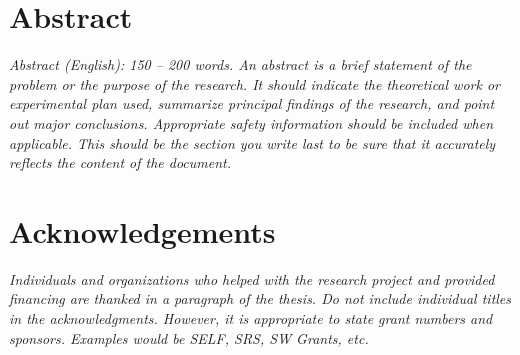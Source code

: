 \documentclass[12pt, a4paper, oneside]{report}
\newcommand{\instructions}[1]{{\color{orange}\itshape #1}}
\begin{document}
\doublespacing %


\chapter*{Abstract}


\instructions{Abstract (English): 150 -- 200 words. An abstract is a brief
statement of the problem or the purpose of the research. It should indicate
the theoretical work or experimental plan used, summarize principal findings
of the research, and point out major conclusions. Appropriate safety
information should be included when applicable. This should be the section
you write last to be sure that it accurately reflects the content of the 
document.}

\vspace{4\bigskipamount}



\chapter*{Acknowledgements}
\label{acknowledgements}

\instructions{Individuals and organizations who helped with the research project and provided financing are thanked in a paragraph of the thesis. Do not include individual titles in the acknowledgments. However, it is appropriate to state grant numbers and sponsors. Examples would be SELF, SRS, SW Grants, etc.}

\newpage


\setcounter{tocdepth}{1}
\listoffigures\newpage


\setcounter{tocdepth}{1}
\listoftables\newpage
\end{document}

